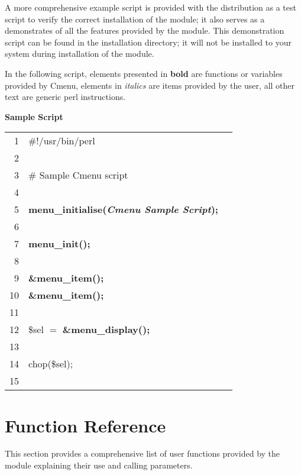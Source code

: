 \documentclass[a4paper,abstracton]{article}
\begin{document}
A more comprehensive example script is provided with the distribution as a test script to verify the correct installation of the module; it also serves as a demonstrates of all the features provided by the module. This demonstration script can be found in the installation directory; it will not be installed to your system during installation of the module.

In the following script, elements presented in \textbf{bold} are functions or variables provided by Cmenu, elements in \textit{italics} are items provided by the user, all other text are generic perl instructions.

\begin{center}
\textbf{Sample Script\\}
\begin{tabular}{rll}
\hline
1&\#!/usr/bin/perl\\
2&\\
3&\# Sample Cmenu script\\
4&\\
5&\textbf{menu\_initialise(\textit{Cmenu Sample Script});}\\
6&\\
7&\textbf{menu\_init();}\\
8&\\
9&\textbf{\&menu\_item();}\\
10&\textbf{\&menu\_item();}\\
11&\\
12&\$sel $=$ \textbf{\&menu\_display();}\\
13&\\
14&chop(\$sel);\\
15&\\
\hline
\end{tabular}
\end{center}


\section{Function Reference}
This section provides a comprehensive list of user functions provided by the module explaining their use and calling parameters.
\end{document}
